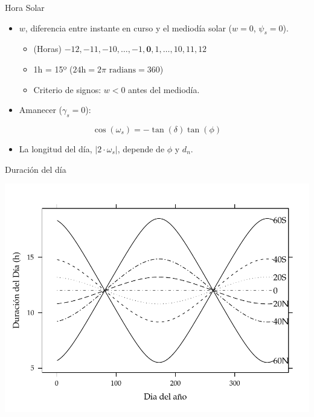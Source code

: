 \documentclass[xcolor={usenames,svgnames,dvipsnames}]{beamer}
\begin{document}
\begin{frame}[label={sec:org7eacbd5}]{Hora Solar}
\begin{itemize}
\item \(w\), diferencia entre instante en curso y el mediodía solar (\(w = 0\), \(\psi_s = 0\)).
\begin{itemize}
\item (Horas) \(-12, -11, -10, \dots, -1, \textbf{0}, 1, \dots, 10, 11, 12\)
\item 1h = 15º (\(24\text{h} = 2\pi \text{ radians} = 360\))
\item Criterio de signos: \(w < 0\) antes del mediodía.
\end{itemize}
\item Amanecer (\(\gamma_{s}=0\)):
\end{itemize}
\[
\cos(\omega_{s}) = -\tan(\delta)\tan(\phi)
\]

\begin{itemize}
\item La longitud del día, \(|2 \cdot \omega_s|\), depende de \(\phi\) y \(d_n\).
\end{itemize}
\end{frame}

\begin{frame}[label={sec:orgb2f5ad0}]{Duración del día}
\begin{center}
\includegraphics[width=.9\linewidth]{../figs/DuracionDia.pdf}
\end{center}
\end{frame}
\end{document}
